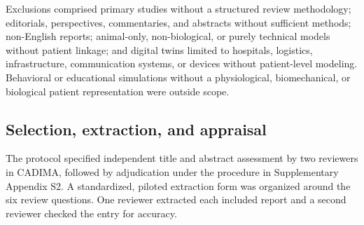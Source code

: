 Exclusions comprised primary studies without a structured review methodology; editorials, perspectives, commentaries, and abstracts without sufficient methods; non-English reports; animal-only, non-biological, or purely technical models without patient linkage; and digital twins limited to hospitals, logistics, infrastructure, communication systems, or devices without patient-level modeling. Behavioral or educational simulations without a physiological, biomechanical, or biological patient representation were outside scope.

\subsection{Selection, extraction, and appraisal}

The protocol specified independent title and abstract assessment by two reviewers in CADIMA, followed by adjudication under the procedure in Supplementary Appendix S2. A standardized, piloted extraction form was organized around the six review questions. One reviewer extracted each included report and a second reviewer checked the entry for accuracy.

